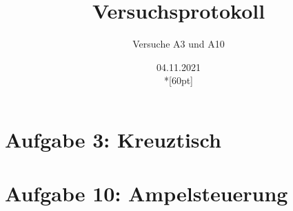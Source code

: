 \documentclass[a4paper,12pt,titlepage]{scrartcl}
\begin{document}
\titlehead
{
    \small
    {
        Technische Universität Ilmenau\\
        Fakulät IA\\
        Fachgebiet Schaltsysteme\\

        Praktikum Schaltsysteme\\
        WS 2021/22}
}

\title {Versuchsprotokoll}
\subtitle{Versuche A3 und A10}
\author{}
\date{04.11.2021\\*[60pt]}
\maketitle

\pagestyle{fancy}
\newpage

\section*{Aufgabe 3: Kreuztisch}


\section*{Aufgabe 10: Ampelsteuerung}
\end{document}
